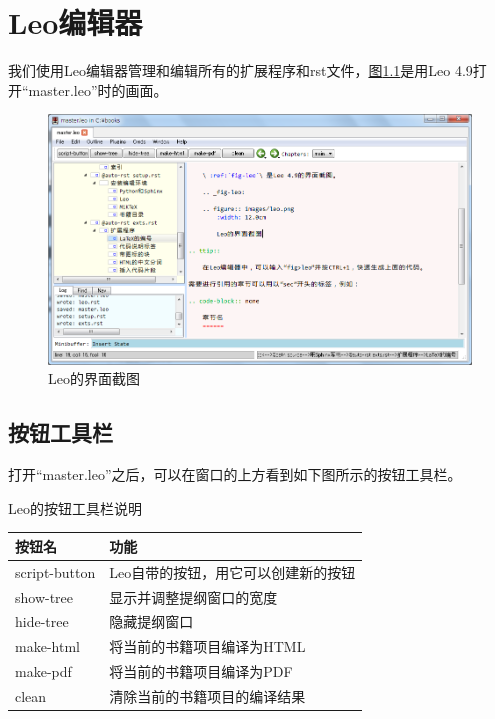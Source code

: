 \documentclass[letterpaper,10pt]{sphinxmanual}
\begin{document}
\chapter{Leo编辑器}
\label{leo::doc}\label{leo:leo}
我们使用Leo编辑器管理和编辑所有的扩展程序和rst文件，{\hyperref[leo:fig-leo]{图\ref*{leo:fig-leo}}}是用Leo 4.9打开“master.leo”时的画面。
\begin{figure}[htbp]
\centering
\capstart

\includegraphics[width=12.0cm]{leo.png}
\caption{Leo的界面截图}\label{leo:fig-leo}\end{figure}


\section{按钮工具栏}
\label{leo:sec-leo-buttons}\label{leo:id1}\label{leo:-sec-leo-buttons}
打开“master.leo”之后，可以在窗口的上方看到如下图所示的按钮工具栏。


\begin{threeparttable}
\capstart\caption{Leo的按钮工具栏说明}

\begin{tabulary}{\linewidth}{|L|L|}
\hline
\textbf{
按钮名
} & \textbf{
功能
}\\\hline

script-button
 & 
Leo自带的按钮，用它可以创建新的按钮
\\\hline

show-tree
 & 
显示并调整提纲窗口的宽度
\\\hline

hide-tree
 & 
隐藏提纲窗口
\\\hline

make-html
 & 
将当前的书籍项目编译为HTML
\\\hline

make-pdf
 & 
将当前的书籍项目编译为PDF
\\\hline

clean
 & 
清除当前的书籍项目的编译结果
\\\hline
\end{tabulary}

\end{threeparttable}
\end{document}
